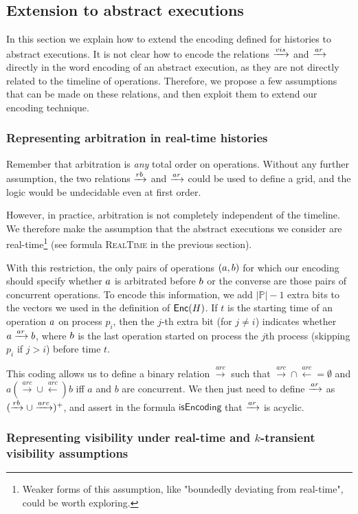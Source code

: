 \subsection{Extension to abstract executions}
In this section we explain how to extend the encoding defined for histories to abstract executions. It is not clear how to encode the relations $\xrightarrow{vis}$ and $\xrightarrow{ar}$ directly in the word encoding of an abstract execution, as they are not directly related to the timeline of operations. Therefore, we propose a few assumptions that can be made on these relations, and then exploit them to extend our encoding technique.

\subsubsection{Representing arbitration in real-time histories}

Remember that arbitration is \emph{any} total order on operations. Without any further assumption, the two relations $\xrightarrow{rb}$ and $\xrightarrow{ar}$ could be used to define a grid, and the logic would be undecidable even at first order.

However, in practice, arbitration is not completely independent of the timeline. 
We therefore make the assumption that the abstract executions we consider are 
real-time\footnote{Weaker forms of this assumption, like "boundedly deviating from real-time", could be worth exploring.} (see formula \textsc{RealTime} in the previous section).

With this restriction, the only pairs of operations $(a,b)$ for which our encoding should specify whether $a$ is arbitrated before $b$ or the converse are those pairs of concurrent operations. 
To encode this information, we add $|\mathbb{P}|-1$ extra bits to the vectors we used
in the definition of $\mathsf{Enc}(H)$. If $t$ is the starting time of an operation $a$ on process $p_i$, then the $j$-th extra bit (for $j\neq i$) indicates whether $a \xrightarrow{ar} b$, where $b$ is the last operation started on process the $j$th process (skipping $p_i$ if $j>i$) before time $t$.

This coding allows us to define a binary relation $\xrightarrow{arc}$ such that 
$\xrightarrow{arc}\cap\xleftarrow{arc}=\emptyset$ and $a(\xrightarrow{arc}\cup\xleftarrow{arc})b$ iff $a$ and $b$ are concurrent. We then just need to define
$\xrightarrow{ar}$ as $(\xrightarrow{rb} \cup \xrightarrow{arc})^+$, and assert in the formula $\mathsf{isEncoding}$ that $\xrightarrow{ar}$ is acyclic.

\subsubsection{Representing visibility under real-time and $k$-transient visibility assumptions}

